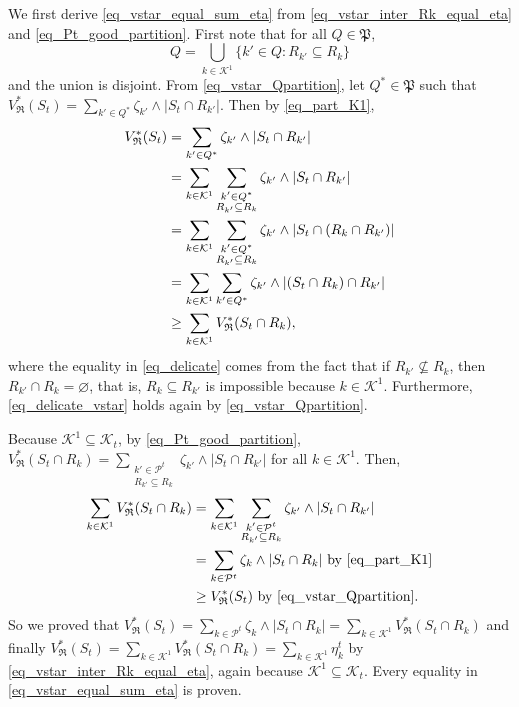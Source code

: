 \documentclass[
  11pt,
  a4paper,
]{article}
\theoremstyle{plain}
\theoremstyle{plain}
\theoremstyle{plain}
\theoremstyle{definition}
\theoremstyle{definition}
\theoremstyle{remark}
\begin{document}
We first derive \eqref{eq_vstar_equal_sum_eta} from
\eqref{eq_vstar_inter_Rk_equal_eta} and \eqref{eq_Pt_good_partition}.
First note that for all \(Q\in\mathfrak P\), \begin{equation}
Q=\bigcup_{k\in\mathcal{K}^1}\{ k' \in Q : R_{k'}\subseteq R_k\}
\label{eq_part_K1}
\end{equation} and the union is disjoint. From
\eqref{eq_vstar_Qpartition}, let \(Q^*\in\mathfrak P\) such that
\(V^*_{\mathfrak{R}}(S_t) = \sum_{k'\in Q^*} \zeta_{k'}\wedge |S_t\cap R_{k'}|\).
Then by \eqref{eq_part_K1}, \begin{align}
V^*_{\mathfrak{R}}(S_t) &= \sum_{k'\in Q^*} \zeta_{k'}\wedge |S_t\cap R_{k'}|\notag\\
&=\sum_{k\in\mathcal{K}^1}  \sum_{\substack{k'\in Q^*\\ R_{k'}\subseteq R_k}} \zeta_{k'}\wedge |S_t\cap R_{k'}|\notag \\
&=\sum_{k\in\mathcal{K}^1}  \sum_{\substack{k'\in Q^*\\ R_{k'}\subseteq R_k}} \zeta_{k'}\wedge |S_t\cap (R_{k}\cap R_{k'})| \notag\\
&=\sum_{k\in\mathcal{K}^1}  \sum_{k'\in Q^*} \zeta_{k'}\wedge |(S_t\cap R_{k})\cap R_{k'}| \label{eq_delicate} \\
&\geq \sum_{k\in\mathcal{K}^1} V^*_{\mathfrak{R}}(S_t\cap R_k),\label{eq_delicate_vstar}
\end{align} where the equality in \eqref{eq_delicate} comes from the
fact that if \(R_{k'}\not\subseteq R_k\), then
\(R_{k'}\cap R_k=\varnothing\), that is, \(R_{k}\subseteq R_{k'}\) is
impossible because \(k\in\mathcal K^1\). Furthermore,
\eqref{eq_delicate_vstar} holds again by \eqref{eq_vstar_Qpartition}.

Because \(\mathcal{K}^1\subseteq\mathcal{K}_t\), by
\eqref{eq_Pt_good_partition},
\(V^*_{\mathfrak{R}}(S_t\cap R_k) = \sum_{\substack{k'\in \mathcal{P}^t\\ R_{k'}\subseteq R_k}} \zeta_{k'}\wedge|S_t \cap R_{k'}|\)
for all \(k\in\mathcal{K}^1\). Then, \begin{align*}
 \sum_{k\in\mathcal{K}^1} V^*_{\mathfrak{R}}(S_t\cap R_k)&=  \sum_{k\in\mathcal{K}^1}\sum_{\substack{k'\in \mathcal{P}^t\\ R_{k'}\subseteq R_k}} \zeta_{k'}\wedge|S_t \cap R_{k'}|\\
 &=\sum_{k\in\mathcal{P}^t} \zeta_{k}\wedge |S_t\cap R_{k}| \text{ by \eqref{eq_part_K1}}\\
 &\geq V^*_{\mathfrak{R}}(S_t) \text{ by \eqref{eq_vstar_Qpartition}}.\\
\end{align*} So we proved that
\(V^*_{\mathfrak{R}}(S_t)= \sum_{k\in\mathcal{P}^t} \zeta_{k}\wedge |S_t\cap R_{k}|= \sum_{k\in\mathcal{K}^1} V^*_{\mathfrak{R}}(S_t\cap R_k)\)
and finally
\(V^*_{\mathfrak{R}}(S_t)=\sum_{k\in\mathcal{K}^1} V^*_{\mathfrak{R}}(S_t\cap R_k)= \sum_{k\in\mathcal{K}^1}  \eta_k^t\)
by \eqref{eq_vstar_inter_Rk_equal_eta}, again because
\(\mathcal{K}^1\subseteq\mathcal{K}_t\). Every equality in
\eqref{eq_vstar_equal_sum_eta} is proven.
\end{document}
